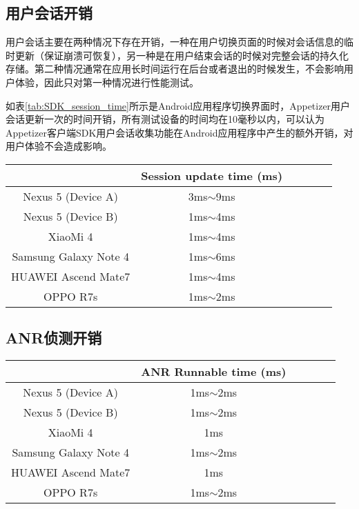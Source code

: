 \subsection{用户会话开销}
\label{subsec:session_cost}

用户会话主要在两种情况下存在开销，一种在用户切换页面的时候对会话信息的临时更新（保证崩溃可恢复），另一种是在用户结束会话的时候对完整会话的持久化存储。第二种情况通常在应用长时间运行在后台或者退出的时候发生，不会影响用户体验，因此只对第一种情况进行性能测试。

如表\ref{tab:SDK_session_time}所示是Android应用程序切换界面时，Appetizer用户会话更新一次的时间开销，所有测试设备的时间均在10毫秒以内，可以认为Appetizer客户端SDK用户会话收集功能在Android应用程序中产生的额外开销，对用户体验不会造成影响。

\begin{table}[!hpb]
	\centering
	\begin{tabular}{c c c c c c} \toprule
		& Session update time (ms) \\ \midrule
		Nexus 5 (Device A) & 3ms$\sim$9ms \\
		Nexus 5 (Device B) & 1ms$\sim$4ms \\
		XiaoMi 4 & 1ms$\sim$4ms \\
		Samsung Galaxy Note 4 & 1ms$\sim$6ms \\
		HUAWEI Ascend Mate7 & 1ms$\sim$4ms \\
		OPPO R7s & 1ms$\sim$2ms \\ \bottomrule
	\end{tabular}
\end{table}


\subsection{ANR侦测开销}
\label{subsec:anr_cost}

\begin{table}[!hpb]
	\centering
	\begin{tabular}{c c c c c c} \toprule
		& ANR Runnable time (ms) \\ \midrule
		Nexus 5 (Device A) & 1ms$\sim$2ms \\
		Nexus 5 (Device B) & 1ms$\sim$2ms \\
		XiaoMi 4 & 1ms \\
		Samsung Galaxy Note 4 & 1ms$\sim$2ms \\
		HUAWEI Ascend Mate7 & 1ms \\
		OPPO R7s & 1ms$\sim$2ms \\ \bottomrule
	\end{tabular}
\end{table}


